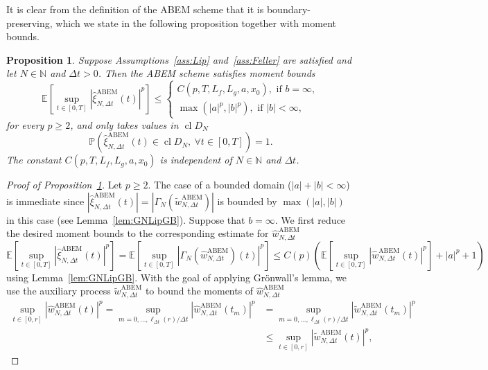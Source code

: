 \documentclass[11pt]{amsart}
\newtheorem{proposition}[theorem]{Proposition}
\newcommand{\E}{{\mathbb E}}
\newcommand{\PP}{{\mathbb P}}
\newcommand{\CDDN}{\operatorname{cl} D_{N}}
\newcommand{\xiNDt}{\hat{\xi}_{N,\Delta t}}
\newcommand{\twNDt}{\tilde{w}_{N,\Delta t}}
\newcommand{\ABEM}{\textrm{ABEM}}
\begin{document}
{It is clear from the definition of the ABEM scheme that it is boundary-preserving, which we state in the following proposition together with moment bounds.
\begin{proposition}\label{prop:ABEMmomBounds}
Suppose Assumptions~\ref{ass:Lip} and~\ref{ass:Feller} are satisfied and let $N \in \mathbb{N}$ and $\Delta t>0$. Then the ABEM scheme satisfies moment bounds
\begin{equation*}
\E \left[ \sup_{t \in [0,T]} \left| \hat{\xi}^{\ABEM}_{N,\Delta t}(t) \right|^{p} \right] \leq  
\begin{cases}
C(p,T,L_{f},L_{g},a,x_{0}), \text{ if } b = \infty,\\
\max(|a|^{p},|b|^{p}), \text{ if } |b| < \infty,
\end{cases}
\end{equation*}
for every $p \geq 2$, and only takes values in $\CDDN$
\begin{equation*}
\PP \left( \hat{\xi}^{\ABEM}_{N,\Delta t}(t) \in \CDDN,\ \forall t \in [0,T] \right)= 1.
\end{equation*}
The constant $C(p,T,L_{f},L_{g},a,x_{0})$ is independent of $N \in \mathbb{N}$ and $\Delta t$.
\end{proposition}
\begin{proof}[Proof of Proposition~\ref{prop:ABEMmomBounds}]
Let $p \geq 2$. The case of a bounded domain ($|a| + |b| < \infty$) is immediate since $|\xiNDt^{\ABEM}(t)| = |\Gamma_{N}(\tilde{w}_{N,\Delta t}^{\ABEM})|$ is bounded by $\max(|a|,|b|)$ in this case (see Lemma~\ref{lem:GNLipGB}). Suppose that $b = \infty$. We first reduce the desired moment bounds to the corresponding estimate for $\hat{w}_{N,\Delta t}^{\ABEM}$
\begin{equation*}
\E \left[ \sup_{t \in [0,T]} \left| \hat{\xi}^{\ABEM}_{N,\Delta t}(t) \right|^{p} \right] = \E \left[ \sup_{t \in [0,T]} \left| \Gamma_{N}\left(\hat{w}_{N,\Delta t}^{\ABEM}\right)(t) \right|^{p} \right] \leq C(p) \left( \E \left[ \sup_{t \in [0,T]} \left| \hat{w}_{N,\Delta t}^{\ABEM}(t) \right|^{p} \right] + |a|^{p} + 1 \right)
\end{equation*} 
using Lemma~\ref{lem:GNLipGB}. With the goal of applying Grönwall's lemma, we use the auxiliary process $\twNDt^{\ABEM}$ to bound the moments of $\hat{w}_{N,\Delta t}^{\ABEM}$
\begin{align*}
\sup_{t \in [0,r]} \left| \hat{w}_{N,\Delta t}^{\ABEM}(t) \right|^{p} = \sup_{m=0,\ldots,\ell_{\Delta t}(r)/\Delta t} \left| \hat{w}_{N,\Delta t}^{\ABEM}(t_{m}) \right|^{p} &= \sup_{m=0,\ldots,\ell_{\Delta t}(r)/\Delta t} \left| \tilde{w}^{\ABEM}_{N,\Delta t}(t_{m}) \right|^{p} \\ &\leq \sup_{t \in [0,r]} \left| \tilde{w}^{\ABEM}_{N,\Delta t}(t) \right|^{p},

\end{align*}
\end{proof}}
\end{document}

